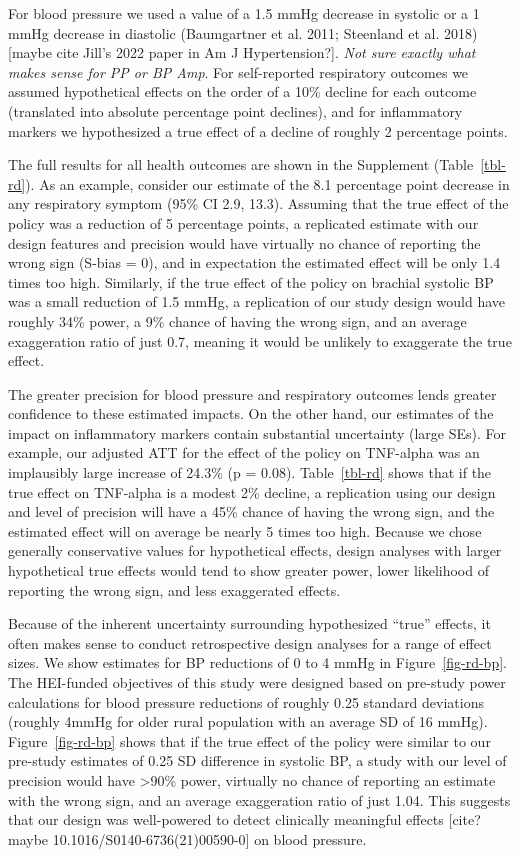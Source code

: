 \documentclass[
  letterpaper,
  DIV=11,
  numbers=noendperiod]{scrartcl}
\begin{document}
For blood pressure we used a value of a 1.5 mmHg decrease in systolic or
a 1 mmHg decrease in diastolic (Baumgartner et al. 2011; Steenland et
al. 2018) {[}maybe cite Jill's 2022 paper in Am J Hypertension?{]}.
\emph{Not sure exactly what makes sense for PP or BP Amp}. For
self-reported respiratory outcomes we assumed hypothetical effects on
the order of a 10\% decline for each outcome (translated into absolute
percentage point declines), and for inflammatory markers we hypothesized
a true effect of a decline of roughly 2 percentage points.

The full results for all health outcomes are shown in the Supplement
(Table~\ref{tbl-rd}). As an example, consider our estimate of the 8.1
percentage point decrease in any respiratory symptom (95\% CI 2.9,
13.3). Assuming that the true effect of the policy was a reduction of 5
percentage points, a replicated estimate with our design features and
precision would have virtually no chance of reporting the wrong sign
(S-bias = 0), and in expectation the estimated effect will be only 1.4
times too high. Similarly, if the true effect of the policy on brachial
systolic BP was a small reduction of 1.5 mmHg, a replication of our
study design would have roughly 34\% power, a 9\% chance of having the
wrong sign, and an average exaggeration ratio of just 0.7, meaning it
would be unlikely to exaggerate the true effect.

The greater precision for blood pressure and respiratory outcomes lends
greater confidence to these estimated impacts. On the other hand, our
estimates of the impact on inflammatory markers contain substantial
uncertainty (large SEs). For example, our adjusted ATT for the effect of
the policy on TNF-alpha was an implausibly large increase of 24.3\% (p =
0.08). Table~\ref{tbl-rd} shows that if the true effect on TNF-alpha is
a modest 2\% decline, a replication using our design and level of
precision will have a 45\% chance of having the wrong sign, and the
estimated effect will on average be nearly 5 times too high. Because we
chose generally conservative values for hypothetical effects, design
analyses with larger hypothetical true effects would tend to show
greater power, lower likelihood of reporting the wrong sign, and less
exaggerated effects.

Because of the inherent uncertainty surrounding hypothesized ``true''
effects, it often makes sense to conduct retrospective design analyses
for a range of effect sizes. We show estimates for BP reductions of 0 to
4 mmHg in Figure~\ref{fig-rd-bp}. The HEI-funded objectives of this
study were designed based on pre-study power calculations for blood
pressure reductions of roughly 0.25 standard deviations (roughly 4mmHg
for older rural population with an average SD of 16 mmHg).
Figure~\ref{fig-rd-bp} shows that if the true effect of the policy were
similar to our pre-study estimates of 0.25 SD difference in systolic BP,
a study with our level of precision would have \textgreater90\% power,
virtually no chance of reporting an estimate with the wrong sign, and an
average exaggeration ratio of just 1.04. This suggests that our design
was well-powered to detect clinically meaningful effects {[}cite? maybe
10.1016/S0140-6736(21)00590-0{]} on blood pressure.
\end{document}
